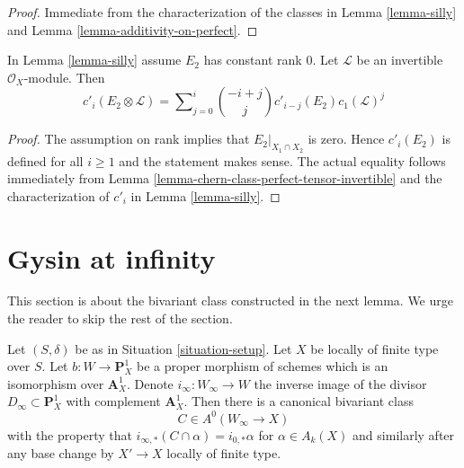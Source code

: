 \begin{proof}
Immediate from the characterization of the classes in
Lemma \ref{lemma-silly} and Lemma \ref{lemma-additivity-on-perfect}.
\end{proof}

\begin{lemma}
\label{lemma-silly-tensor-invertible}
In Lemma \ref{lemma-silly} assume $E_2$ has constant rank $0$.
Let $\mathcal{L}$ be an invertible $\mathcal{O}_X$-module. Then
$$
c'_i(E_2 \otimes \mathcal{L}) =
\sum\nolimits_{j = 0}^i
\binom{- i + j}{j} c'_{i - j}(E_2) c_1(\mathcal{L})^j
$$
\end{lemma}

\begin{proof}
The assumption on rank implies that $E_2|_{X_1 \cap X_2}$ is zero.
Hence $c'_i(E_2)$ is defined for all $i \geq 1$ and the statement
makes sense. The actual equality follows
immediately from Lemma \ref{lemma-chern-class-perfect-tensor-invertible}
and the characterization of $c'_i$ in Lemma \ref{lemma-silly}.
\end{proof}







\section{Gysin at infinity}
\label{section-gysin-at-infty}

\noindent
This section is about the bivariant class constructed in the next
lemma. We urge the reader to skip the rest of the section.

\begin{lemma}
\label{lemma-gysin-at-infty}
Let $(S, \delta)$ be as in Situation \ref{situation-setup}.
Let $X$ be locally of finite type over $S$. Let
$b : W \to \mathbf{P}^1_X$ be a proper morphism of schemes
which is an isomorphism over $\mathbf{A}^1_X$.
Denote $i_\infty : W_\infty \to W$ the inverse image of the divisor
$D_\infty \subset \mathbf{P}^1_X$ with complement $\mathbf{A}^1_X$.
Then there is a canonical bivariant class
$$
C \in A^0(W_\infty \to X)
$$
with the property that
$i_{\infty, *}(C \cap \alpha) = i_{0, *}\alpha$
for $\alpha \in A_k(X)$ and similarly after any base change by
$X' \to X$ locally of finite type.
\end{lemma}

